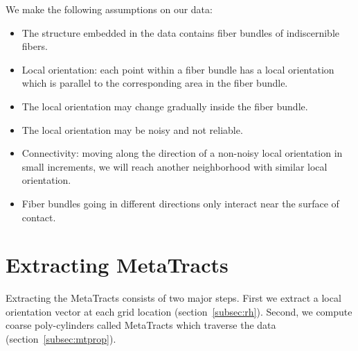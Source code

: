 We make the following assumptions on our data:
\begin{itemize}[noitemsep]
\item The structure embedded in the data contains fiber bundles of indiscernible fibers.
\item Local orientation: each point within a fiber bundle has a local orientation which is parallel to the corresponding area in the fiber bundle.
\item The local orientation may change gradually inside the fiber bundle.
\item The local orientation may be noisy and not reliable.
\item Connectivity: moving along the direction of a non-noisy local orientation in small increments, we will reach another neighborhood with similar local orientation.
\item Fiber bundles going in different directions only interact near the surface of contact.
\end{itemize}



\section {Extracting MetaTracts }
\label{sec:approach}
Extracting the MetaTracts consists of two  major steps. First we extract a local orientation vector at each grid location (section~\ref{subsec:rh}). Second, we compute coarse poly-cylinders called MetaTracts which traverse the data (section~\ref{subsec:mtprop}).

